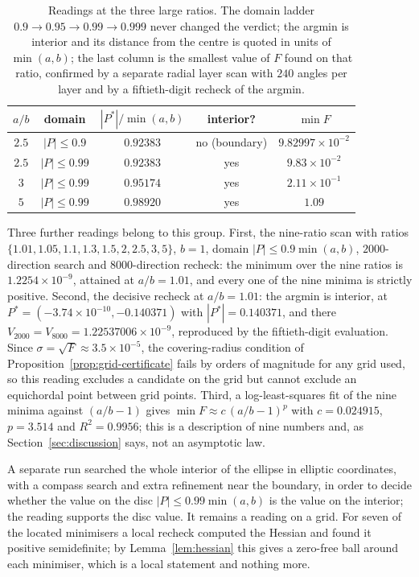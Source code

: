 \documentclass[11pt]{article}
\theoremstyle{definition}
\theoremstyle{remark}
\begin{document}
{\begin{table}[htbp]
\centering
\small
\caption{Readings at the three large ratios. The domain ladder $0.9\to0.95\to0.99\to0.999$ never changed the
verdict; the argmin is interior and its distance from the centre is quoted in units of $\min(a,b)$; the last
column is the smallest value of $F$ found on that ratio, confirmed by a separate radial layer scan with $240$
angles per layer and by a fiftieth-digit recheck of the argmin.}
\label{tab:ellipse-large}
\begin{tabular}{@{}ccccc@{}}
\toprule
$a/b$ & domain & $|P^{*}|/\min(a,b)$ & interior? & $\min F$ \\
\midrule
$2.5$ & $|P|\le0.9$ & $0.92383$ & no (boundary) & $9.82997\times10^{-2}$ \\
$2.5$ & $|P|\le0.99$ & $0.92383$ & yes & $9.83\times10^{-2}$ \\
$3$ & $|P|\le0.99$ & $0.95174$ & yes & $2.11\times10^{-1}$ \\
$5$ & $|P|\le0.99$ & $0.98920$ & yes & $1.09$ \\
\bottomrule
\end{tabular}
\end{table}

Three further readings belong to this group. First, the nine-ratio scan with ratios
$\{1.01,1.05,1.1,1.3,1.5,2,2.5,3,5\}$, $b=1$, domain $|P|\le0.9\min(a,b)$, $2000$-direction search and
$8000$-direction recheck: the minimum over the nine ratios is $1.2254\times10^{-9}$, attained at $a/b=1.01$, and
every one of the nine minima is strictly positive. Second, the decisive recheck at $a/b=1.01$: the argmin is
interior, at $P^{*}=(-3.74\times10^{-10},-0.140371)$ with $|P^{*}|=0.140371$, and there
$V_{2000}=V_{8000}=1.22537006\times10^{-9}$, reproduced by the fiftieth-digit evaluation. Since
$\sigma=\sqrt{F}\approx3.5\times10^{-5}$, the covering-radius condition of
Proposition~\ref{prop:grid-certificate} fails by orders of magnitude for any grid used, so this reading excludes a
candidate on the grid but cannot exclude an equichordal point between grid points. Third, a log-least-squares fit
of the nine minima against $(a/b-1)$ gives $\min F\approx c\,(a/b-1)^{p}$ with $c=0.024915$, $p=3.514$ and
$R^2=0.9956$; this is a description of nine numbers and, as Section~\ref{sec:discussion} says, not an asymptotic law.

A separate run searched the whole interior of the ellipse in elliptic coordinates, with a compass search and extra
refinement near the boundary, in order to decide whether the value on the disc $|P|\le0.99\min(a,b)$ is the value
on the interior; the reading supports the disc value. It remains a reading on a grid. For seven of the located
minimisers a local recheck computed the Hessian and found it positive semidefinite; by
Lemma~\ref{lem:hessian} this gives a zero-free ball around each minimiser, which is a local statement and nothing
more.

}
\end{document}
